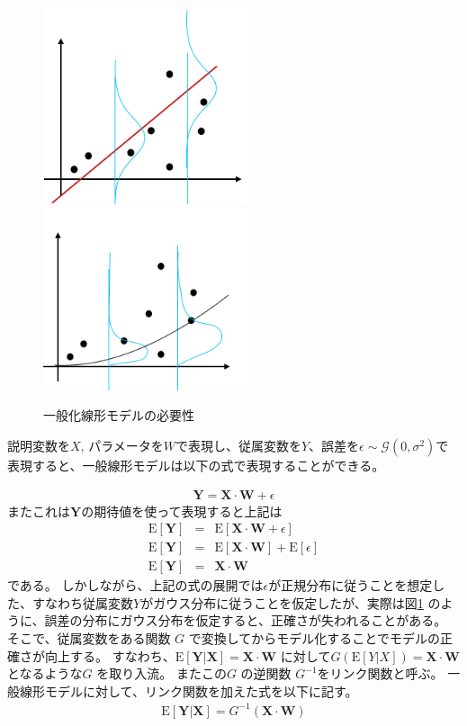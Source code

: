 \begin{figure}[hbtp]
        \includegraphics[width=6cm]{asset/glm1.png}~~~~~ ~~~~~ 
        \includegraphics[width=6cm]{asset/glm2.png}
            \caption{一般化線形モデルの必要性}
            \label{glm}
\end{figure}

説明変数を$ X $, パラメータを$ W $で表現し、従属変数を$ Y $、誤差を$ \epsilon \sim \mathcal{G}(0, \sigma^2) $で表現すると、一般線形モデルは以下の式で表現することができる。

\begin{eqnarray}
\mathbf{Y} = \mathbf{X} \cdot  \mathbf{W} + \epsilon
\label{eq:senkei}
\end{eqnarray}
またこれは$ \mathbf{Y} $の期待値を使って表現すると上記は
\begin{eqnarray}
    \mathrm{E}[\mathbf{Y}] &=& \mathrm{E}[\mathbf{X} \cdot  \mathbf{W} + \epsilon] \\
    \mathrm{E}[\mathbf{Y}] &=& \mathrm{E}[\mathbf{X} \cdot  \mathbf{W}] + \mathrm{E}[\epsilon] \\
    \mathrm{E}[\mathbf{Y}] &=& \mathbf{X} \cdot  \mathbf{W}
\label{eq:link}
\end{eqnarray}
である。
しかしながら、上記の式の展開では$ \epsilon $が正規分布に従うことを想定した、すなわち従属変数$ Y $がガウス分布に従うことを仮定したが、実際は図\ref{glm} のように、誤差の分布にガウス分布を仮定すると、正確さが失われることがある。
そこで、従属変数をある関数 $ G $ で変換してからモデル化することでモデルの正確さが向上する。
すなわち、$ \mathrm{E}[\mathbf{Y|X}] = \mathbf{X} \cdot  \mathbf{W} $ に対して$ G(\mathrm{E}[Y|X]) = \mathbf{X} \cdot  \mathbf{W} $ となるような$ G $ を取り入流。
またこの$ G $ の逆関数 $ G^{-1} $をリンク関数と呼ぶ。
一般線形モデルに対して、リンク関数を加えた式を以下に記す。
\begin{eqnarray}
\mathrm{E}[\mathbf{Y|X}]=G^{-1} (\mathbf{X}\cdot  \mathbf{W})
\label{eq:link}
\end{eqnarray}

